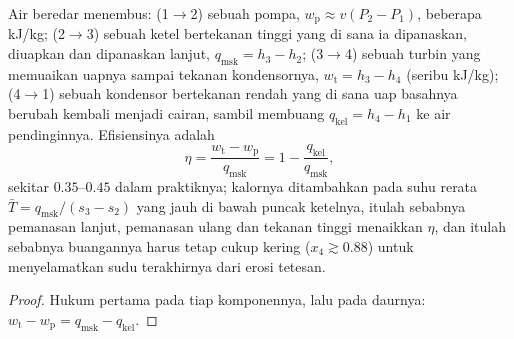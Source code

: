 \begin{proposition}\label{prop:b2:open-systems:rankine}
Air beredar menembus: (1$\to$2) sebuah pompa, $w_{\text{p}} \approx v(P_2 -
P_1)$, beberapa \unit{kJ/kg}; (2$\to$3) sebuah ketel bertekanan tinggi yang di sana ia
dipanaskan, diuapkan dan dipanaskan lanjut, $q_{\text{msk}} = h_3 - h_2$;
(3$\to$4) sebuah turbin yang memuaikan uapnya sampai tekanan kondensornya,
$w_{\text{t}} = h_3 - h_4$ (seribu \unit{kJ/kg}); (4$\to$1) sebuah kondensor
bertekanan rendah yang di sana uap basahnya berubah kembali menjadi cairan, sambil membuang
$q_{\text{kel}} = h_4 - h_1$ ke air pendinginnya. Efisiensinya adalah
\[
\eta = \frac{w_{\text{t}} - w_{\text{p}}}{q_{\text{msk}}} = 1 - \frac{q_{\text{kel}}}{q_{\text{msk}}} ,
\]
sekitar $0.35$--$0.45$ dalam praktiknya; kalornya ditambahkan pada suhu
rerata $\bar T = q_{\text{msk}}/(s_3 - s_2)$ yang jauh di bawah puncak ketelnya,
itulah sebabnya pemanasan lanjut, pemanasan ulang dan tekanan tinggi menaikkan
$\eta$, dan itulah sebabnya buangannya harus tetap cukup kering ($x_4 \gtrsim 0.88$) untuk
menyelamatkan sudu terakhirnya dari erosi tetesan.
\end{proposition}

\begin{proof}
Hukum pertama pada tiap komponennya, lalu pada daurnya: $w_{\text{t}} - w_{\text{p}}
= q_{\text{msk}} - q_{\text{kel}}$.
\end{proof}

